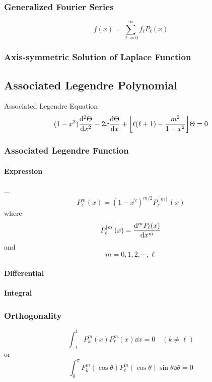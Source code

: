 \documentclass[UTF8]{ctexart} %
\numberwithin{equation}{section}
\begin{document}
\subsubsection{Generalized Fourier Series}
\begin{equation}\label{key}
f(x) = \sum_{\ell=0}^\infty f_\ell P_\ell(x)
\end{equation}

\subsubsection{Axis-symmetric Solution of Laplace Function}


\subsection{Associated Legendre Polynomial}
Associated Legendre Equation
\begin{equation}\label{key}
(1 - x^2)\dv[2]{\Theta}{x} - 2x\dv{\Theta}{x} + \qty[\ell(\ell+1) - \dfrac{m^2}{1-x^2}]\Theta = 0
\end{equation}

\subsubsection{Associated Legendre Function}
\paragraph{Expression}
...\\
\begin{equation}\label{key}
P_\ell^m(x) = (1 - x^2)^{m/2} P_\ell^{[m]}(x)
\end{equation}
where
\begin{equation}\label{key}
P_\ell^{[m]}(x) = \dv[m]{P_\ell(x)}{x}
\end{equation}
and
\begin{equation}\label{key}
m = 0,1,2,\cdots,\ell
\end{equation}

\paragraph{Differential}

\paragraph{Integral}

\subsubsection{Orthogonality}
\begin{equation}\label{key}
\int_{-1}^1 P_k^m(x) P_\ell^m(x)\dd x = 0 \quad (k\neq\ell)
\end{equation}
or
\begin{equation}\label{key}
\int_0^\pi P_k^m(\cos\theta) P_\ell^m(\cos\theta)\sin\theta\dd\theta = 0
\end{equation}
\end{document}
